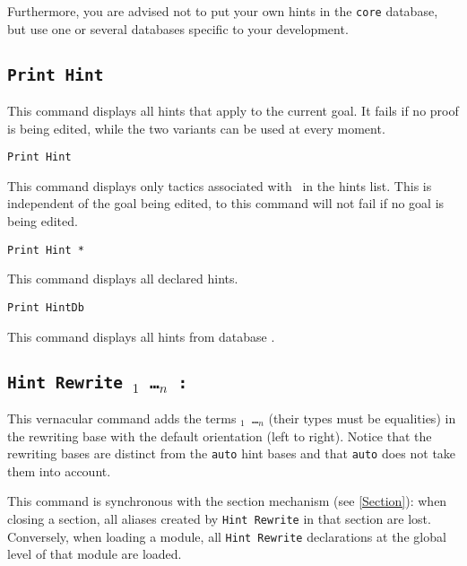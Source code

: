 Furthermore, you are advised not to put your own hints in the
{\tt core} database, but use one or several databases specific to your
development.

\subsection{\tt Print Hint
\label{PrintHint}
}

This command displays all hints that apply to the current goal. It
fails if no proof is being edited, while the two variants can be used at
every moment.

\begin{Variants}

\item {\tt  Print Hint {\ident} }

 This command displays only tactics associated with \ident\ in the
 hints list. This is independent of the goal being edited, to this
 command will not fail if no goal is being edited.

\item {\tt Print Hint *}

  This command displays all declared hints. 

\item {\tt  Print HintDb {\ident} }
\label{PrintHintDb}

 This command displays all hints from database \ident.

\end{Variants}

\subsection{\tt Hint Rewrite \term$_1$ \dots \term$_n$ : \ident
\label{HintRewrite}
}

This vernacular command adds the terms {\tt \term$_1$ \dots \term$_n$}
(their types must be equalities) in the rewriting base {\tt \ident}
with the default orientation (left to right). Notice that the
rewriting bases are distinct from the {\tt auto} hint bases and that
{\tt auto} does not take them into account.

This command is synchronous with the section mechanism (see \ref{Section}):
when closing a section, all aliases created by \texttt{Hint Rewrite} in that
section are lost. Conversely, when loading a module, all \texttt{Hint Rewrite}
declarations at the global level of that module are loaded.

